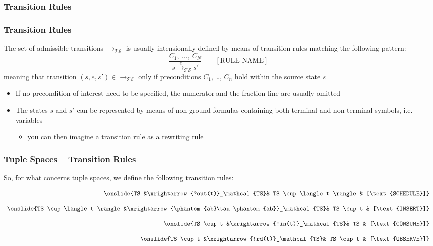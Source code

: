 \documentclass[presentation]{beamer}\mode<presentation>{\usetheme{AMSCesenaPurpleAndGold}}
\begin{document}
\subsubsection{Transition Rules}

\begin{frame}
\frametitle{Transition Rules}

    \begin{block}{}
        The set of admissible transitions $\longrightarrow_\mathcal{TS}$ is usually \alert{intensionally} defined by means of transition rules matching the following pattern:
        \[
            \frac{C_1,\ \ldots,\ C_N}{s \stackrel{e}{\longrightarrow}_\mathcal{TS} s'} \qquad [\text{RULE-NAME}]
        \]
        meaning that transition $(s, e, s') \in \longrightarrow_\mathcal{TS}$ only if \alert{preconditions} $C_1$, \ldots, $C_n$ hold within the source state $s$
    \end{block}
    \vfill
    \begin{itemize}
        \item If no precondition of interest need to be specified, the numerator and the fraction line are usually \alert{omitted}
        
        
        \item The states $s$ and $s'$ can be represented by means of non-ground formulas containing both terminal and non-terminal symbols, i.e. variables
        \begin{itemize}
            \item you can then imagine a transition rule as a \alert{rewriting rule}
        \end{itemize}
    \end{itemize}

\end{frame}

\begin{frame}
\frametitle{Tuple Spaces  -- Transition Rules}
    So, for what concerns \linda{} tuple spaces, we define the following transition rules:
    
    \[\begin{array}{rclr}
        \onslide{TS &\xrightarrow{?out(t)}_\mathcal{TS}& TS \cup \langle t \rangle & [\text{SCHEDULE}]} \\
        \\
        \onslide{TS \cup \langle t \rangle &\xrightarrow{\phantom{ab}\tau\phantom{ab}}_\mathcal{TS}& TS \cup t & [\text{INSERT}]} \\
        \\
        \onslide{TS \cup t &\xrightarrow{!in(t)}_\mathcal{TS}& TS & [\text{CONSUME}]} \\
        \\
        \onslide{TS \cup t &\xrightarrow{!rd(t)}_\mathcal{TS}& TS \cup t & [\text{OBSERVE}]} \\
    \end{array}\]
    
\end{frame}
\end{document}
